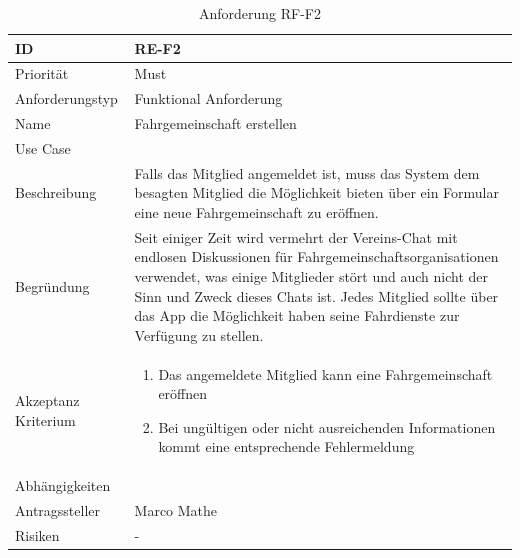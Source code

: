 \begin{table}[ht]
\centering
  \begin{tabular}{ l | p{8cm} }
	\hline
	\rowcolor{gray}
	ID 			&	\textbf{RE-F2}\\ \hline
	Priorität 		&	Must\\ \hline
	Anforderungstyp	&	Funktional Anforderung\\ \hline
	Name 			&	Fahrgemeinschaft erstellen\\ \hline
	Use Case 		&	\nameref{table:use_case_1}\\ \hline
	Beschreibung 	&	Falls das Mitglied angemeldet ist, muss das System dem besagten Mitglied die Möglichkeit bieten über ein Formular eine neue Fahrgemeinschaft zu eröffnen.\\ \hline
	Begründung 		&	Seit einiger Zeit wird vermehrt der Vereins-Chat mit endlosen Diskussionen für Fahrgemeinschaftsorganisationen verwendet, was einige Mitglieder stört und auch nicht der Sinn und Zweck dieses Chats ist. Jedes Mitglied sollte über das App die Möglichkeit haben seine Fahrdienste zur Verfügung zu stellen.\\ \hline
	Akzeptanz Kriterium	&	\begin{enumerate}
					\item Das angemeldete Mitglied kann eine Fahrgemeinschaft eröffnen
					\item Bei ungültigen oder nicht ausreichenden Informationen kommt eine entsprechende Fehlermeldung
					\end{enumerate}
					\\ \hline
	Abhängigkeiten 	&	\nameref{table:req_1}\\ \hline
	Antragssteller 	&	Marco Mathe\\ \hline
	Risiken	 	&	-
  \end{tabular}
   \caption{Anforderung RF-F2}\label{table:req_2}
\end{table}

